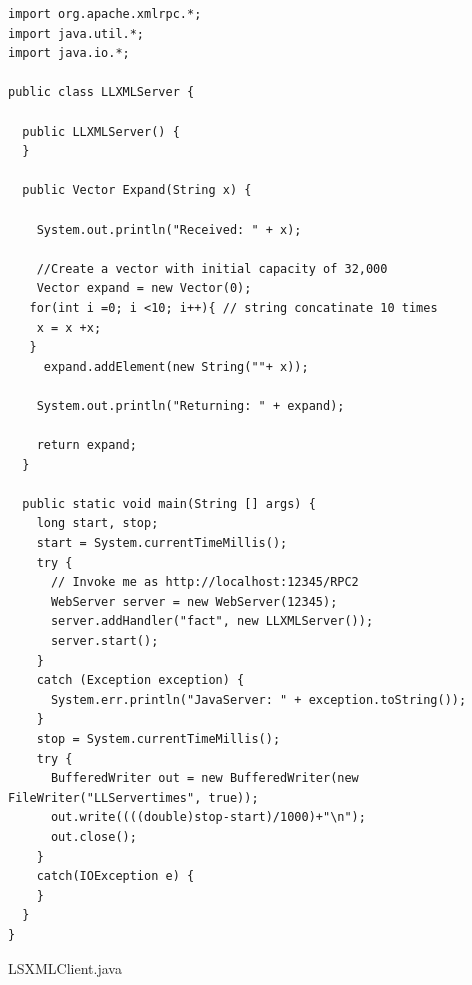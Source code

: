 \documentclass{article}
\begin{document}
\begin{lstlisting}
import org.apache.xmlrpc.*;
import java.util.*;
import java.io.*;

public class LLXMLServer {

  public LLXMLServer() {
  }

  public Vector Expand(String x) {

    System.out.println("Received: " + x);

    //Create a vector with initial capacity of 32,000
    Vector expand = new Vector(0);
   for(int i =0; i <10; i++){ // string concatinate 10 times
    x = x +x;
   }
     expand.addElement(new String(""+ x));

    System.out.println("Returning: " + expand);

    return expand;
  }

  public static void main(String [] args) {
    long start, stop;
    start = System.currentTimeMillis();
    try {
      // Invoke me as http://localhost:12345/RPC2
      WebServer server = new WebServer(12345);
      server.addHandler("fact", new LLXMLServer());
      server.start();
    }
    catch (Exception exception) {
      System.err.println("JavaServer: " + exception.toString());
    }
    stop = System.currentTimeMillis();
    try {
      BufferedWriter out = new BufferedWriter(new FileWriter("LLServertimes", true));
      out.write((((double)stop-start)/1000)+"\n");
      out.close();
    }
    catch(IOException e) {
    }
  }
}

\end{lstlisting}

LSXMLClient.java
\end{document}

